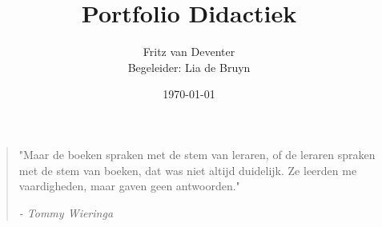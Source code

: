 \documentclass{article}
\title{Portfolio Didactiek}
\author{Fritz van Deventer\\ Begeleider: Lia de Bruyn}
\date{\today}
\begin{document}
 
\maketitle


\begin{quote}
  "Maar de boeken spraken met de stem van leraren, of de leraren spraken met de stem van boeken, dat was niet altijd duidelijk. Ze leerden me vaardigheden, maar gaven geen antwoorden."
  \begin{flushright}
    \textit{ - Tommy Wieringa\nocite{speedboot}}
  \end{flushright}
\end{quote}


\clearpage

\tableofcontents
\clearpage







\clearpage

\clearpage
\begin{appendices}










\end{appendices}
\end{document}
